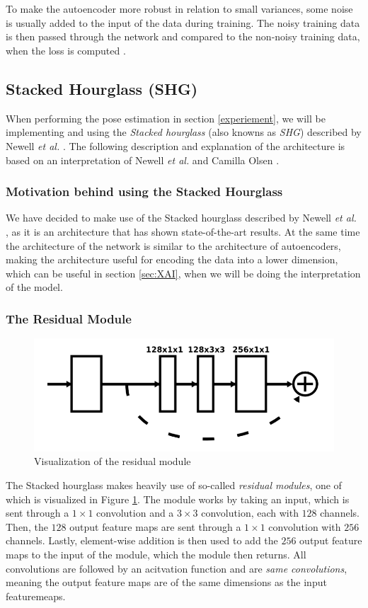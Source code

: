 \documentclass[./main.tex]{subfiles}
\begin{document}
\\
\\
To make the autoencoder more robust in relation to small variances, some noise is usually added to the input of the data during training. The noisy training data is then passed through the network and compared to the non-noisy training data, when the loss is computed \cite{DeepLearning}.

\subsection{Stacked Hourglass (SHG)}\label{subsec:SHG}
When performing the pose estimation in section \ref{experiement}, we will be implementing and using the \textit{Stacked hourglass} (also knowns as \textit{SHG}) described by Newell \textit{et al.} \cite{Newell}. The following description and explanation of the architecture is based on an interpretation of Newell \textit{et al.} \cite{Newell} and Camilla Olsen \cite{Camilla}.

\subsubsection{Motivation behind using the Stacked Hourglass}\label{subsec:reasoning}
We have decided to make use of the Stacked hourglass described by Newell \textit{et al.} \cite{Newell}, as it is an architecture that has shown state-of-the-art results. At the same time the architecture of the network is similar to the architecture of autoencoders, making the architecture useful for encoding the data into a lower dimension, which can be useful in section \ref{sec:XAI}, when we will be doing the interpretation of the model.

\subsubsection{The Residual Module}
\begin{figure}[htbp]
    \centering
    \includegraphics[height = 2 cm]{entities/Residual.png}
    \caption{Visualization of the residual module \cite{Newell}}
    \label{fig:residual}
\end{figure}
\noindent The Stacked hourglass makes heavily use of so-called \textit{residual modules}, one of which is visualized in Figure \ref{fig:residual}. The module works by taking an input, which is sent through a $1 \times 1$ convolution and a $3 \times 3$ convolution, each with $128$ channels. Then, the $128$ output feature maps are sent through a $1 \times 1$ convolution with $256$ channels. Lastly, element-wise addition is then used to add the $256$ output feature maps to the input of the module, which the module then returns. All convolutions are followed by an acitvation function and are \textit{same convolutions}, meaning the output feature maps are of the same dimensions as the input featuremeaps.
\end{document}
